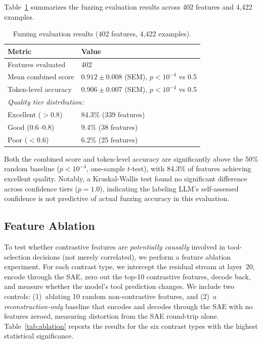 \documentclass[runningheads]{llncs}
\begin{document}
Table~\ref{tab:fuzzing} summarizes the fuzzing evaluation results across 402 features and 4,422 examples.

\begin{table}[t]
\caption{Fuzzing evaluation results (402 features, 4,422 examples).}
\label{tab:fuzzing}
\centering
\begin{tabular}{ll}
\toprule
Metric & Value \\
\midrule
Features evaluated & 402 \\
Mean combined score & $0.912 \pm 0.008$ (SEM), $p < 10^{-4}$ vs 0.5 \\
Token-level accuracy & $0.906 \pm 0.007$ (SEM), $p < 10^{-4}$ vs 0.5 \\
\midrule
\multicolumn{2}{l}{\textit{Quality tier distribution:}} \\
Excellent ($> 0.8$) & 84.3\% (339 features) \\
Good ($0.6$--$0.8$) & 9.4\% (38 features) \\
Poor ($< 0.6$) & 6.2\% (25 features) \\
\bottomrule
\end{tabular}
\end{table}

Both the combined score and token-level accuracy are significantly above the 50\% random baseline ($p < 10^{-4}$, one-sample $t$-test), with 84.3\% of features achieving excellent quality. Notably, a Kruskal-Wallis test found no significant difference across confidence tiers ($p = 1.0$), indicating the labeling LLM's self-assessed confidence is not predictive of actual fuzzing accuracy in this evaluation.

\subsection{Feature Ablation}
\label{sec:ablation}

To test whether contrastive features are \emph{potentially causally} involved in tool-selection decisions (not merely correlated), we perform a feature ablation experiment. For each contrast type, we intercept the residual stream at layer~20, encode through the SAE, zero out the top-10 contrastive features, decode back, and measure whether the model's tool prediction changes. We include two controls: (1)~ablating 10 random non-contrastive features, and (2)~a \emph{reconstruction-only} baseline that encodes and decodes through the SAE with no features zeroed, measuring distortion from the SAE round-trip alone. Table~\ref{tab:ablation} reports the results for the six contrast types with the highest statistical significance.
\end{document}
